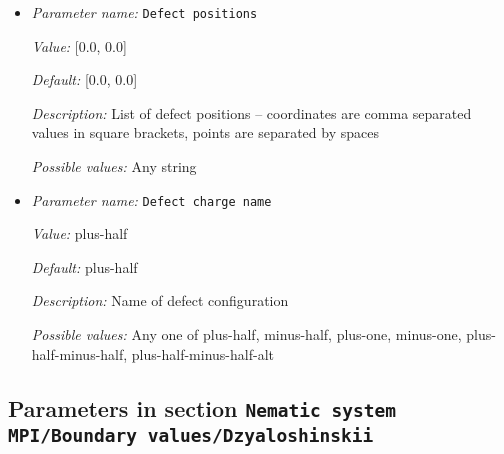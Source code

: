 \begin{itemize}
\item {\it Parameter name:} {\tt Defect positions}
\label{parameters:Nematic system MPI/Boundary values/Defect configurations/Defect positions}
\label{parameters:Nematic_20system_20MPI/Boundary_20values/Defect_20configurations/Defect_20positions}


{\it Value:} [0.0, 0.0]


{\it Default:} [0.0, 0.0]


{\it Description:} List of defect positions -- coordinates are comma separated values in square brackets, points are separated by spaces


{\it Possible values:} Any string
\item {\it Parameter name:} {\tt Defect charge name}
\label{parameters:Nematic system MPI/Boundary values/Defect configurations/Defect charge name}
\label{parameters:Nematic_20system_20MPI/Boundary_20values/Defect_20configurations/Defect_20charge_20name}


{\it Value:} plus-half


{\it Default:} plus-half


{\it Description:} Name of defect configuration


{\it Possible values:} Any one of plus-half, minus-half, plus-one, minus-one, plus-half-minus-half, plus-half-minus-half-alt
\end{itemize}

\subsection{Parameters in section \tt Nematic system MPI/Boundary values/Dzyaloshinskii}
\label{parameters:Nematic_20system_20MPI/Boundary_20values/Dzyaloshinskii}

